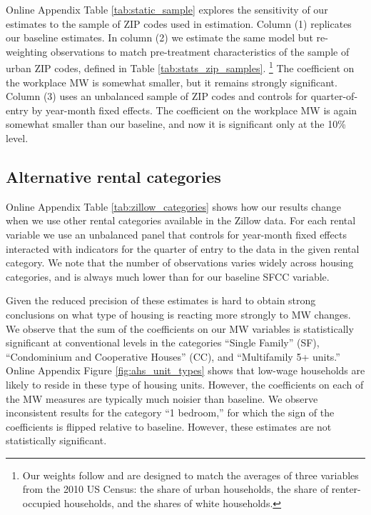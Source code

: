 Online Appendix Table \ref{tab:static_sample} explores the sensitivity of our 
estimates to the sample of ZIP codes used in estimation.
Column (1) replicates our baseline estimates.
In column (2) we estimate the same model but re-weighting observations 
to match pre-treatment characteristics of the sample of urban ZIP codes,
defined in Table \ref{tab:stats_zip_samples}.%
\footnote{Our weights follow \textcite{Hainmueller2012} and are designed to 
    match the averages of three variables from the 2010 US Census:
    the share of urban households,
    the share of renter-occupied households, and
    the shares of white households.}
The coefficient on the workplace MW is somewhat smaller, but it remains 
strongly significant.
Column (3) uses an unbalanced sample of ZIP codes and controls for 
quarter-of-entry by year-month fixed effects.
The coefficient on the workplace MW is again somewhat smaller than our baseline,
and now it is significant only at the 10\% level.


\subsection{Alternative rental categories}
\label{sec:alternative_categories}

Online Appendix Table \ref{tab:zillow_categories} shows how our results change 
when we use other rental categories available in the Zillow data.
For each rental variable we use an unbalanced panel that controls for
year-month fixed effects interacted with indicators for the quarter of entry
to the data in the given rental category.
We note that the number of observations varies widely across housing categories, 
and is always much lower than for our baseline SFCC variable.

Given the reduced precision of these estimates is hard to obtain strong 
conclusions on what type of housing is reacting more strongly to MW changes.
We observe that the sum of the coefficients on our MW variables is 
statistically significant at conventional levels in the categories 
``Single Family'' (SF),  ``Condominium and Cooperative Houses'' (CC), and 
``Multifamily 5+ units.''
Online Appendix Figure \ref{fig:ahs_unit_types} shows that low-wage households 
are likely to reside in these type of housing units.
However, the coefficients on each of the MW measures are typically much noisier 
than baseline.
We observe inconsistent results for the category ``1 bedroom,'' for which the 
sign of the coefficients is flipped relative to baseline.
However, these estimates are not statistically significant.

